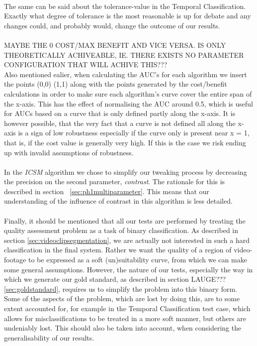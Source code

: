 \\
The same can be said about the tolerance-value in the Temporal Classification. Exactly what degree of tolerance is the most reasonable is up for debate and any changes could, and probably would, change the outcome of our results.\\
\\
MAYBE THE 0 COST/MAX BENEFIT AND VICE VERSA. IS ONLY THEORETICALLY ACHIVEABLE, IE. THERE EXISTS NO PARAMETER CONFIGURATION THAT WILL ACHIVE THIS???\\
Also mentioned ealier, when calculating the AUC's for each algorithm we insert the points (0,0) (1,1) along with the points generated by the cost/benefit calculations in order to make sure each algorithm's curve cover the entire span of the x-axis. This has the effect of normalising the AUC around 0.5, which is useful for AUCs based on a curve that is only defined partly along the x-axis. It is however possible, that the very fact that a curve is not defined all along the x-axis is a sign of low robustness especially if the curve only is present near x = 1, that is, if the cost value is generally very high. If this is the case we risk ending up with invalid assumptions of robustness.\\
\\
In the \textit{ICSM} algorithm we chose to simplify our tweaking process by decreasing the precision on the second parameter, \textit{contrast}. The rationale for this is described in section~ \ref{sec:ph1multiparameter}. This means that our understanding of the influence of contrast in this algorithm is less detailed.\\
\\
Finally, it should be mentioned that all our tests are performed by treating the quality assessment problem as a task of binary classification. As described in section \ref{sec:videoclipsegmentation}, we are actually not interested in such a hard classification in the final system. Rather we want the quality of a region of video-footage to be expressed as a soft (un)suitability curve, from which we can make some general assumptions. However, the nature of our tests, especially the way in which we generate our gold standard, as described in section LAUGE??? \ref{sec:goldstandard}, requires us to simplify the problem into this binary form. Some of the aspects of the problem, which are lost by doing this, are to some extent accounted for, for example in the Temporal Classification test case, which allows for misclassifications to be treated in a more soft manner, but others are undeniably lost. This should also be taken into account, when considering the generalisability of our results.
%
